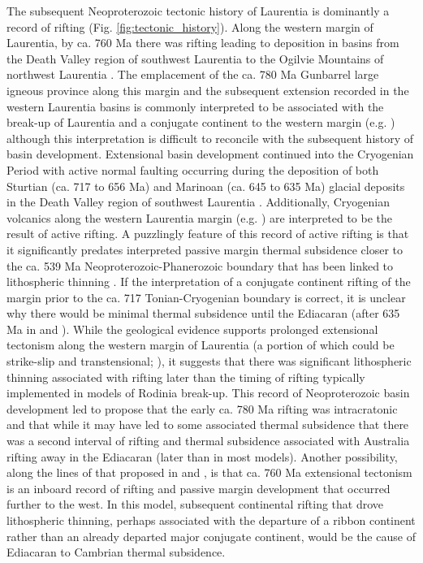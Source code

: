 \documentclass[twocolumn, switch]{article} %
\begin{document}
The subsequent Neoproterozoic tectonic history of Laurentia is dominantly a record of rifting (Fig. \ref{fig:tectonic_history}). Along the western margin of Laurentia, by ca. 760 Ma there was rifting leading to deposition in basins from the Death Valley region of southwest Laurentia to the Ogilvie Mountains of northwest Laurentia \citep{Macdonald2013a, Strauss2015a, Dehler2017a, Rooney2017a}. The emplacement of the ca. 780 Ma Gunbarrel large igneous province \citep{Harlan2003a} along this margin and the subsequent extension recorded in the western Laurentia basins is commonly interpreted to be associated with the break-up of Laurentia and a conjugate continent to the western margin (e.g. \citealp{Li2008a}) although this interpretation is difficult to reconcile with the subsequent history of basin development. Extensional basin development continued into the Cryogenian Period with active normal faulting occurring during the deposition of both Sturtian (ca. 717 to 656 Ma) and Marinoan (ca. 645 to 635 Ma) glacial deposits in the Death Valley region of southwest Laurentia \citep{Nelson2020a}. Additionally, Cryogenian volcanics along the western Laurentia margin (e.g. \citealp{Eyster2018a}) are interpreted to be the result of active rifting.  A puzzlingly feature of this record of active rifting is that it significantly predates interpreted passive margin thermal subsidence closer to the ca. 539 Ma Neoproterozoic-Phanerozoic boundary that has been linked to lithospheric thinning \citep{Bond1984a, Levy1991a}. If the interpretation of a conjugate continent rifting of the margin prior to the ca. 717 Tonian-Cryogenian boundary is correct, it is unclear why there would be minimal thermal subsidence until the Ediacaran (after 635 Ma in \citealp{Levy1991a} and \citealp{Witkosky2018a}). While the geological evidence supports prolonged extensional tectonism along the western margin of Laurentia (a portion of which could be strike-slip and transtensional; \citealp{Smith2015b}), it suggests that there was significant lithospheric thinning associated with rifting later than the timing of rifting typically implemented in models of Rodinia break-up. This record of Neoproterozoic basin development led \cite{Yonkee2014a} to propose that the early ca. 780 Ma rifting was intracratonic and that while it may have led to some associated thermal subsidence that there was a second interval of rifting and thermal subsidence associated with Australia rifting away in the Ediacaran (later than in most models). Another possibility, along the lines of that proposed in \citet{Ross1991a} and \citet{Colpron2002a}, is that ca. 760 Ma extensional tectonism is an inboard record of rifting and passive margin development that occurred further to the west. In this model, subsequent continental rifting that drove lithospheric thinning, perhaps associated with the departure of a ribbon continent rather than an already departed major conjugate continent, would be the cause of Ediacaran to Cambrian thermal subsidence.
\end{document}

